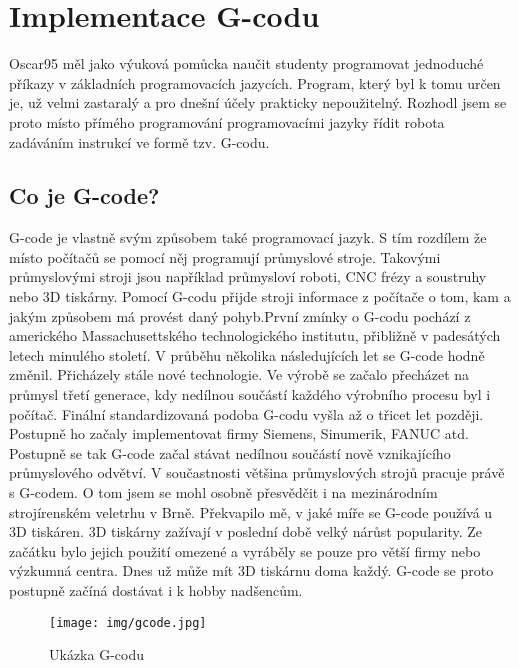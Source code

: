 \section{Implementace G-codu}
Oscar95 měl jako výuková pomůcka naučit studenty programovat jednoduché příkazy v základních programovacích jazycích. Program, který byl k tomu určen je, už velmi zastaralý a pro dnešní účely prakticky nepoužitelný. Rozhodl jsem se proto místo přímého programování programovacími jazyky řídit robota zadáváním instrukcí ve formě tzv. G-codu. 
    
    \subsection{Co je G-code?}
   G-code je vlastně svým způsobem také programovací jazyk. S tím rozdílem že místo počítačů se pomocí něj programují průmyslové stroje. Takovými průmyslovými stroji jsou například průmysloví roboti, CNC frézy a soustruhy nebo 3D tiskárny. Pomocí G-codu přijde stroji informace z počítače o tom, kam a jakým způsobem má provést daný pohyb.První zmínky o G-codu pochází z amerického Massachusettského technologického institutu, přibližně v padesátých letech minulého století. V průběhu několika následujících let se G-code hodně změnil. Přicházely stále nové technologie. Ve výrobě se začalo přecházet na průmysl třetí generace, kdy nedílnou součástí každého výrobního procesu byl i počítač. Finální standardizovaná podoba G-codu vyšla až o třicet let později. Postupně ho začaly implementovat firmy Siemens, Sinumerik, FANUC atd. Postupně se tak G-code začal stávat nedílnou součástí nově vznikajícího průmyslového odvětví. V součastnosti většina prů\-myslových strojů pracuje právě s G-codem. O tom jsem se mohl osobně přesvědčit i na mezinárodním strojírenském veletrhu v Brně. Překvapilo mě, v jaké míře se G-code používá u 3D tiskáren. 3D tiskárny zažívají v poslední době velký nárůst popularity. Ze začátku bylo jejich použití omezené a vyráběly se pouze pro větší firmy nebo výzkumná centra. Dnes už může mít 3D tiskárnu doma každý.  G-code se proto  postupně začíná dostávat i k hobby nadšencům. \cite{G-code-explained} \cite{G-code-wiki}
    
    	\begin{figure}
    		\begin{center}
    			\texttt{[image: img/gcode.jpg]}
    			\caption{Ukázka G-codu \cite{G-code-foto}}
    			\label{fig:gcode}
    		\end{center}
    		\vspace{-2mm}
    	\end{figure}
    
